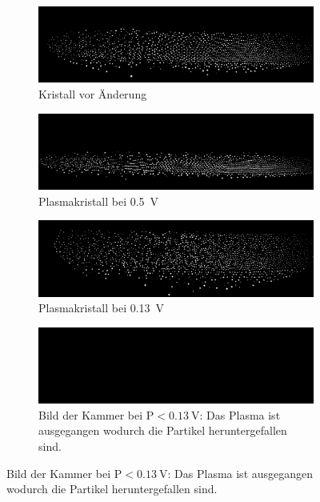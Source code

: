 \documentclass[12pt,a4paper,ngerman]{article}
\begin{document}
	\begin{figure}
		\centering
		\begin{subfigure}[b]{0.45\textwidth}
			\includegraphics[width=\textwidth]{data/Export/ausgangszustand_vorSpannungsaenderung.png}
			\caption{Kristall vor Änderung}
			\label{fig:Spannungsänderung_sub1}
		\end{subfigure}
		\hfill %
		\begin{subfigure}[b]{0.45\textwidth}
			\includegraphics[width=\textwidth]{data/Export/ausgangszustand_spannung_0.5V.png}
			\caption[Spannungsänderung 1]{Plasmakristall bei \qty{0,5}{\volt}}
			\label{fig:Spannungsänderung_sub2}
		\end{subfigure}
		
		\begin{subfigure}[b]{0.45\textwidth}
			\includegraphics[width=\textwidth]{data/Export/ausgangszustand_spannung_0.13V.png}
			\caption[Spannungsänderung 2]{Plasmakristall bei \qty{0,13}{\volt}}
			\label{fig:Spannungsänderung_sub3}
		\end{subfigure}
		\hfill %
		\begin{subfigure}[b]{0.45\textwidth}
			\includegraphics[width=\textwidth]{data/Export/start.png}
			\caption[Leere Kammer]{Bild der Kammer bei $\mathrm{P}<\qty{0,13}{\volt}$: Das Plasma ist ausgegangen wodurch die Partikel heruntergefallen sind.}
			\label{fig:Spannungsänderung_sub4}
		\end{subfigure}
		

\end{figure}
\end{document}
